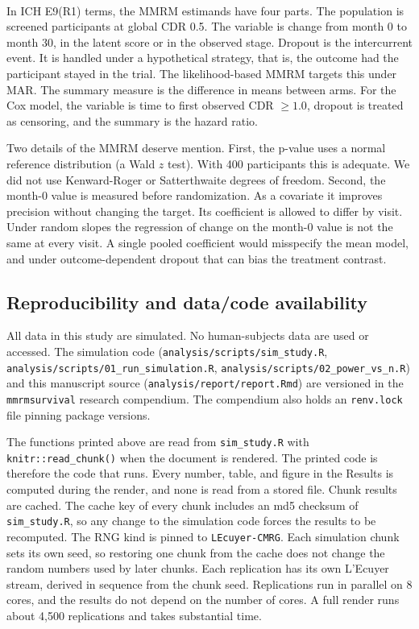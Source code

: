 \documentclass[
  11pt,
]{article}
\newcounter{none} %
\begin{document}
In ICH E9(R1) terms\textsuperscript{}, the MMRM estimands
have four parts. The population is screened participants at
global CDR 0.5. The variable is change from month 0 to
month 30, in the latent score or in the observed stage.
Dropout is the intercurrent event. It is handled under a
hypothetical strategy, that is, the outcome had the
participant stayed in the trial. The likelihood-based MMRM
targets this under MAR. The summary measure is the
difference in means between arms. For the Cox model, the
variable is time to first observed CDR \(\geq 1.0\), dropout
is treated as censoring, and the summary is the hazard
ratio.

Two details of the MMRM deserve mention. First, the
p-value uses a normal reference distribution (a Wald \(z\)
test). With 400 participants this is adequate. We did not
use Kenward-Roger or Satterthwaite degrees of freedom.
Second, the month-0 value is measured before
randomization. As a covariate it improves precision
without changing the target. Its coefficient is allowed
to differ by visit. Under random slopes the regression of
change on the month-0 value is not the same at every
visit. A single pooled coefficient would misspecify the
mean model, and under outcome-dependent dropout that can
bias the treatment contrast.

\subsection{Reproducibility and data/code availability}\label{reproducibility-and-datacode-availability}

All data in this study are simulated. No human-subjects
data are used or accessed. The simulation code
(\texttt{analysis/scripts/sim\_study.R},
\texttt{analysis/scripts/01\_run\_simulation.R},
\texttt{analysis/scripts/02\_power\_vs\_n.R}) and this manuscript
source (\texttt{analysis/report/report.Rmd}) are versioned in the
\texttt{mmrmsurvival} research compendium. The compendium also
holds an \texttt{renv.lock} file pinning package versions.

The functions printed above are read from \texttt{sim\_study.R}
with \texttt{knitr::read\_chunk()} when the document is rendered.
The printed code is therefore the code that runs. Every
number, table, and figure in the Results is computed
during the render, and none is read from a stored file.
Chunk results are cached. The cache key of every chunk
includes an md5 checksum of \texttt{sim\_study.R}, so any change
to the simulation code forces the results to be
recomputed. The RNG kind is pinned to \texttt{L\textquotesingle{}Ecuyer-CMRG}.
Each simulation chunk sets its own seed, so restoring one
chunk from the cache does not change the random numbers
used by later chunks. Each replication has its own
L'Ecuyer stream, derived in sequence from the chunk seed.
Replications run in parallel on 8 cores, and the
results do not depend on the number of cores. A full
render runs about 4,500 replications and takes
substantial time.
\end{document}
